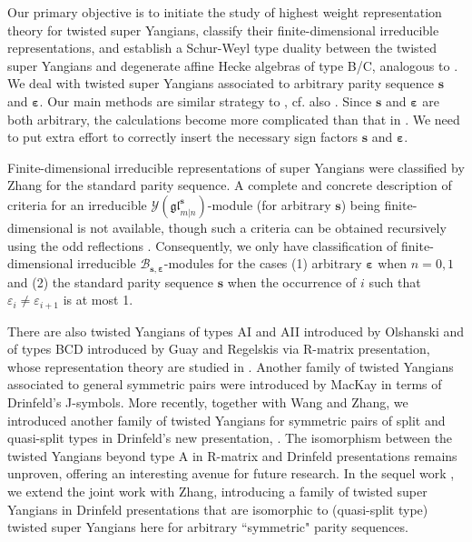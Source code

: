\documentclass[11pt,reqno]{amsart}
\numberwithin{equation}{section}
\theoremstyle{definition}
\theoremstyle{remark}
\newcommand{\gl}{\mathfrak{gl}}
\newcommand{\ve}{\varepsilon}
\newcommand{\s}{{\bm s}}
\begin{document}
Our primary objective is to initiate the study of highest weight representation theory for twisted super Yangians, classify their finite-dimensional irreducible representations, and establish a Schur-Weyl type duality between the twisted super Yangians and degenerate affine Hecke algebras of type B/C, analogous to \cite{Molev2002reflection,Chen2014twisted}. We deal with twisted super Yangians associated to arbitrary parity sequence $\s$ and $\bm\ve$. Our main methods are similar strategy to \cite{Molev1998finite,Molev2002reflection,Chen2014twisted}, cf. also \cite{Guay2017representationsI}. Since $\s$ and $\bm\ve$ are both arbitrary, the calculations become more complicated than that in \cite{Molev2002reflection,Chen2014twisted}. We need to put extra effort to correctly insert the necessary sign factors $\s$ and $\bm\ve$.

Finite-dimensional irreducible representations of super Yangians were classified by Zhang \cite{Zhang1995reps,Zhang1996super} for the standard parity sequence. A complete and concrete description of criteria for an irreducible $\mathscr Y(\gl_{m|n}^\s)$-module (for arbitrary $\s$) being finite-dimensional is not available, though such a criteria can be obtained recursively using the odd reflections \cite{Molev2022odd,Lu2022note}. Consequently, we only have classification of finite-dimensional irreducible $\mathscr B_{\s,\bm\ve}$-modules for the cases (1) arbitrary $\bm\ve$ when $n=0,1$ and (2) the standard parity sequence $\s$ when the occurrence of $i$ such that $\ve_i\ne \ve_{i+1}$  is at most 1.

There are also twisted Yangians of types AI and AII introduced by Olshanski \cite{Olshanski1992twisted} and of types BCD introduced by Guay and Regelskis \cite{Guay2016twisted} via R-matrix presentation, whose representation theory are studied in \cite{Molev1998finite,Guay2017representationsI}. Another family of twisted Yangians associated to general symmetric pairs were introduced by MacKay \cite{MacKay2002rational} in terms of Drinfeld's J-symbols. More recently, together with Wang and Zhang, we introduced another family of twisted Yangians for symmetric pairs of split and quasi-split types in Drinfeld's new presentation, \cite{Lu2023drinfeld,Lu2024drinfeld,Lu2024affine}. The isomorphism between the twisted Yangians beyond type A in R-matrix and Drinfeld presentations  remains unproven, offering an interesting avenue for future research. In the sequel work \cite{Lu2024twisted}, we extend the joint work \cite{Lu2024drinfeld} with Zhang, introducing a family of twisted super Yangians in Drinfeld presentations that are isomorphic to (quasi-split type) twisted super Yangians here for arbitrary ``symmetric" parity sequences.
\end{document}

